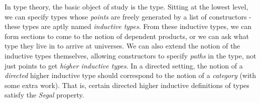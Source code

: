 \documentclass[main.tex]{subfiles}
\begin{document}
In type theory, the basic object of study is the type. Sitting at the lowest level, we can specify types whose \textit{points} are freely generated by a list of constructors - these types are aptly named \textit{inductive types}. From these inductive types, we can form sections to come to the notion of dependent products, or we can ask what type they live in to arrive at universes. We can also extend the notion of the inductive types themselves, allowing constructors to specify \textit{paths} in the type, not just points to get \textit{higher inductive types}. In a directed setting, the notion of a \textit{directed} higher inductive type should correspond to the notion of a \textit{category} (with some extra work). That is, certain directed higher inductive definitions of types satisfy the \textit{Segal} property.
\end{document}
